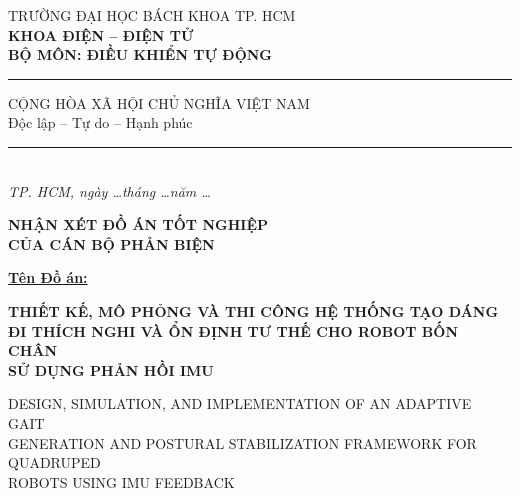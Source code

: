 \documentclass[12pt,a4paper]{article}
\begin{document}
\newpage

\noindent
\begin{minipage}[t]{0.48\textwidth}
    \centering
    {\small TRƯỜNG ĐẠI HỌC BÁCH KHOA TP. HCM} \\
    \textbf{KHOA ĐIỆN -- ĐIỆN TỬ} \\
    \textbf{BỘ MÔN: ĐIỀU KHIỂN TỰ ĐỘNG} \\
    \vspace{0.1cm}
    \rule{3.5cm}{0.5pt}
\end{minipage}
\hfill
\begin{minipage}[t]{0.48\textwidth}
    \centering
    {\small CỘNG HÒA XÃ HỘI CHỦ NGHĨA VIỆT NAM} \\
    {\small Độc lập -- Tự do -- Hạnh phúc} \\
    \vspace{0.1cm}
    \rule{4cm}{0.5pt} \\
    \vspace{0.2cm}
    \textit{\small TP. HCM, ngày \dots tháng \dots năm \dots}
\end{minipage}

\vspace{0.5cm}

\begin{center}
    {\large \textbf{NHẬN XÉT ĐỒ ÁN TỐT NGHIỆP}} \\[0.1cm]
    {\large \textbf{CỦA CÁN BỘ PHẢN BIỆN}}
\end{center}

\vspace{0.2cm}

\noindent \underline{\textbf{Tên Đồ án:}}

\vspace{0.2cm}

\begin{center}
    {\large \textbf{THIẾT KẾ, MÔ PHỎNG VÀ THI CÔNG HỆ THỐNG TẠO DÁNG \\
    ĐI THÍCH NGHI VÀ ỔN ĐỊNH TƯ THẾ CHO ROBOT BỐN CHÂN \\
    SỬ DỤNG PHẢN HỒI IMU}}
    
    \vspace{0.1cm}
    {\small DESIGN, SIMULATION, AND IMPLEMENTATION OF AN ADAPTIVE GAIT \\
    GENERATION AND POSTURAL STABILIZATION FRAMEWORK FOR QUADRUPED \\
    ROBOTS USING IMU FEEDBACK}
\end{center}
\end{document}

